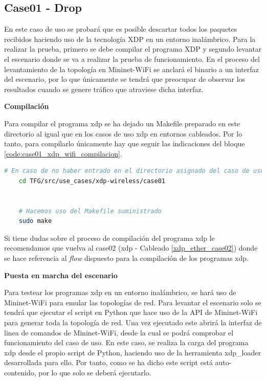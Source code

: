 \subsection{Case01 - Drop}
\label{xdp_wifi_case01}

En este caso de uso se probará que es posible descartar todos los paquetes recibidos haciendo uso de la tecnología XDP en un entorno inalámbrico. Para la realizar la prueba, primero se debe compilar el programa XDP y segundo levantar el escenario donde se va a realizar la prueba  de funcionamiento. En el proceso del levantamiento de la topología en Mininet-WiFi se anclará el binario a un interfaz del escenario, por lo que únicamente se tendrá que preocupar de observar los resultados cuando se genere tráfico que atraviese dicha interfaz.\\
\par
\vspace{0.5cm}
\textbf{Compilación}\\
\par

Para compilar el programa \gls{xdp} se ha dejado un Makefile preparado en este directorio al igual que en los casos de uso \gls{xdp} en entornos cableados. Por lo tanto, para compilarlo únicamente hay que seguir las indicaciones del bloque \ref{code:case01_xdp_wifi_compilacion}.

\begin{lstlisting}[language= bash, style=Consola, caption={Compilación programa XDP - Case01},label=code:case01_xdp_wifi_compilacion]
    # En caso de no haber entrado en el directorio asignado del caso de uso
    cd TFG/src/use_cases/xdp-wireless/case01
    
    
    # Hacemos uso del Makefile suministrado 
    sudo make
\end{lstlisting}
\vspace{0.5cm}

Si tiene dudas sobre el proceso de compilación del programa \gls{xdp} le recomendamos que vuelva al case02 (\gls{xdp} - Cableado \ref{xdp_ether_case02}) donde se hace referencia al \textit{flow} dispuesto para la compilación de los programas \gls{xdp}.



\vspace{1cm}
\textbf{Puesta en marcha del escenario}\\
\par

Para testear los programas \gls{xdp} en un entorno inalámbrico, se hará uso de Mininet-WiFi para emular las topologías de red. Para levantar el escenario solo se tendrá que ejecutar el script en Python que hace uso de la API de Mininet-WiFi para generar toda la topología de red. Una vez ejecutado este abrirá la interfaz de linea de comandos de Mininet-WiFi, desde la cual se podrá comprobar el funcionamiento del caso de uso. En este caso, se realiza la carga del programa \gls{xdp} desde el propio script de Python, haciendo uso de la herramienta xdp\_loader desarrollada para ello. Por tanto, como se ha dicho este script está auto-contenido, por lo que solo se deberá ejecutarlo. \\
\par

